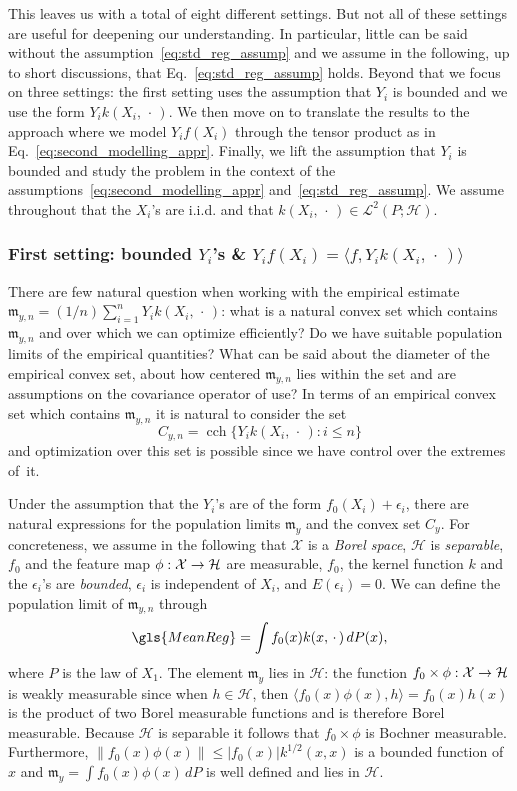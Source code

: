 \documentclass[10pt]{amsart}
\theoremstyle{definition}\newtheorem{defi}[theo]{Definition}\newtheorem{rema}[theo]{Remark}\newtheorem{exam}[theo]{Example}\newtheorem{exem}[theo]{Example}\newtheorem{nota}[theo]{Notation}
\theoremstyle{remark}
\DeclareMathOperator{\cch}{cch}
\newcommand{\X}{\mathcal{X}}
\newcommand{\cH}{\mathcal{H}}
\newcommand{\clL}{\mathcal{L}}
\newcommand{\mean}{\mathfrak{m}}
\renewcommand*{\to}{\mathchoice{\longrightarrow}{\rightarrow}{\rightarrow}{\rightarrow}}
\begin{document}
This leaves us with a total of eight different settings. But not all of these settings are useful for deepening our understanding. In particular, little can be said without the assumption~\eqref{eq:std_reg_assump} and we assume in the following, up to short discussions, that Eq.~\eqref{eq:std_reg_assump} holds. Beyond that we focus on three settings: the first setting uses the assumption that $Y_i$ is bounded and we use the form $Y_i k(X_i,\,\cdot\,)$. We then move on to translate the results to the approach where we model $Y_i f(X_i)$ through the tensor product as in Eq.~\eqref{eq:second_modelling_appr}. Finally, we lift the assumption that $Y_i$ is bounded and study the problem in the context of the assumptions~\eqref{eq:second_modelling_appr} and~\eqref{eq:std_reg_assump}. We assume throughout that the $X_i$'s are i.i.d. and that $k(X_i,\,\cdot\,) \in
\clL^2(P;\cH)$.



\subsubsection{First setting: bounded \texorpdfstring{$Y_i$}{Y\_i}'s \& \texorpdfstring{$Y_i f(X_i) = \langle f,Y_i k(X_i,\,\cdot\,)\rangle$}{Y\_i f(X\_i) = < f,Y\_i k(X\_i,.)>}} \label{sec:bnd_Y}
There are few natural question when working with the empirical estimate $\mean_{y,n} = (1/n) \sum_{i=1}^n Y_i k(X_i,\,\cdot\,)$: what is a natural convex set which contains $\mean_{y,n}$ and over which we can optimize efficiently? Do we have suitable population limits of the empirical quantities? What can be said about the diameter of the empirical convex set, about how centered $\mean_{y,n}$ lies within the set and are assumptions on the covariance operator of use? In terms of an empirical convex set which contains $\mean_{y,n}$ it is natural to consider the set
\[
C_{y,n} = \cch \{Y_i k(X_i,\,\cdot\,) : i \leq n\}
\]
and optimization over this set is possible since we have control over the extremes of~it.


Under the assumption that the $Y_i$'s are of the form $f_0(X_i) + \epsilon_i$, there are natural expressions for the population limits $\mean_y$ and the convex set $C_y$. For concreteness, we assume in the following that $\X$ is a \emph{Borel space}, $\cH$ is \emph{separable}, $f_0$ and the feature map $\phi:\X \to \cH$ are measurable, $f_0$, the kernel function $k$ and the $\epsilon_i$'s are \emph{bounded}, $\epsilon_i$ is independent of $X_i$, and $E(\epsilon_i) = 0$. We can define the population limit of $\mean_{y,n}$ through
\[
\gls{MeanReg} = \int f_0(x) k(x,\,\cdot\,) \, dP(x),
\]
where $P$ is the law of $X_1$. The element $\mean_y$ lies in $\cH$: the function $f_0 \times \phi : \X \to \cH$ is weakly measurable since when $h \in \cH$, then $\langle f_0(x) \phi(x), h \rangle = f_0(x) h(x)$ is the product of two Borel measurable functions and is therefore Borel measurable. Because $\cH$ is separable it follows that $f_0 \times \phi$ is Bochner measurable. Furthermore, $ \| f_0(x) \phi(x) \| \leq |f_0(x)| k^{1/2}(x,x)$ is a bounded function of $x$ and $\mean_y = \int f_0(x) \phi(x) \,dP$ is well defined and lies in $\cH$.
\end{document}
